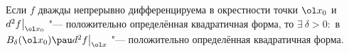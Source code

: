  \label{582} Если $f$ дважды
	 непрерывно дифференцируема в окрестности точки $\ol x_0$ и $d^2f\big|_{\ol x_0}$ "--- положительно определённая квадратичная форма, то $\exists\ \delta > 0\colon$
	 в $B_\delta (\ol x_0)\pau d^2f\big|_{\ol x}$ "--- положительно определённая квадратичная форма.
	 